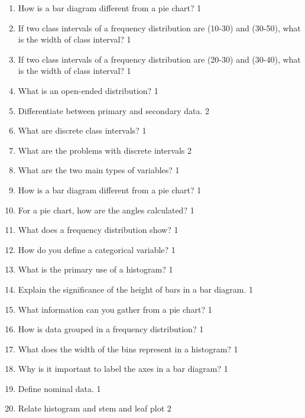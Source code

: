 \documentclass[a4paper,oneside]{book}
\begin{document}
\begin{enumerate}

\item How is a bar diagram different from a pie chart? \hfill 1

 \item If two class intervals of a frequency distribution are (10-30) and 
 (30-50), what is the width of class interval? \hfill 1
  \item If two class intervals of a frequency distribution are (20-30) and 
 (30-40), what is the width of class interval? \hfill 1
  \item What is an open-ended distribution? \hfill 1
  \item Differentiate between primary and secondary data. \hfill 2
  \item   What are discrete class intervals? \hfill 1
  \item 	What are the problems with discrete intervals \hfill 2
  \item What are the two main types of variables? \hfill 1

\item How is a bar diagram different from a pie chart? \hfill 1

  \item For a pie chart, how are the angles calculated? \hfill 1

\item What does a frequency distribution show? \hfill 1

\item How do you define a categorical variable? \hfill 1

\item What is the primary use of a histogram? \hfill 1

\item Explain the significance of the height of bars in a bar diagram. \hfill 1

\item What information can you gather from a pie chart? \hfill 1

\item How is data grouped in a frequency distribution? \hfill 1

\item What does the width of the bins represent in a histogram? \hfill 1

\item Why is it important to label the axes in a bar diagram? \hfill 1

\item Define nominal data. \hfill 1
  \item Relate histogram and stem and leaf plot \hfill 2


\end{enumerate}
\end{document}
